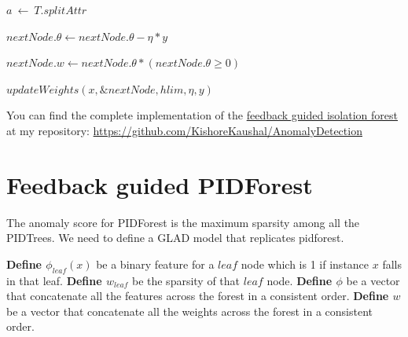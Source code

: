 \vspace{1em}
\begin{algorithm}[H]
    \caption{$updateWeights(x, T, hlim, \eta, y)$}
    \label{alg:update-weights-iforest}
    \DontPrintSemicolon
    \SetAlgoLined


    $a \: \leftarrow \: T.splitAttr$



    $nextNode.\theta \leftarrow nextNode.\theta - \eta * y$

    $nextNode.w \leftarrow nextNode.\theta * (nextNode.\theta \geq 0)$

    $updateWeights(x, \&nextNode, hlim, \eta, y)$
\end{algorithm}
\vspace{2em}

You can find the complete implementation of the  \href{https://github.com/KishoreKaushal/AnomalyDetection/blob/master/isolationforest/FeedbackIsolationForest.py}{feedback guided isolation forest} at my repository: \url{https://github.com/KishoreKaushal/AnomalyDetection}



\section{Feedback guided PIDForest}
\label{sec:feedback-guided-pidforest}

The anomaly score for PIDForest is the maximum sparsity among all the PIDTrees.
We need to define a GLAD model that replicates pidforest.

\textbf{Define $\phi_{leaf}(x)$} be a binary feature for a $leaf$ node which is 1 if instance $x$ falls in that leaf.
\textbf{Define $w_{leaf}$} be the sparsity of that $leaf$ node.
\textbf{Define $\phi$}  be a vector that concatenate all the features across the forest in a consistent order.
\textbf{Define $w$}  be a vector that concatenate all the weights across the forest in a consistent order.


